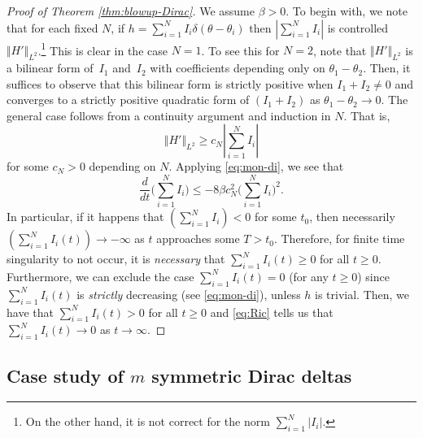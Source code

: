 \documentclass[10pt]{amsart}
\theoremstyle{plain}
\theoremstyle{definition}
\newcommand{\nrm}[1]{\Vert#1\Vert}
\let\bt\beta
\let\dlt\delta
\let\tht\theta
\begin{document}
\begin{proof}[Proof of Theorem \ref{thm:blowup-Dirac}]

We assume $\bt>0$. To begin with, we note that for each fixed $N$, if $h = \sum_{i=1}^{N} I_i\dlt(\tht-\tht_i)$ then $|\sum_{i=1}^{N} I_i|$ is controlled $\nrm{H'}_{L^{2}}$.\footnote{On the other hand, it is not correct for the norm $\sum_{i=1}^{N} |I_i|$.} This is clear in the case $N=1$. To see this for $N=2$, note that $\nrm{H'}_{L^2}$ is a bilinear form of~$I_1$ and~$I_2$ with coefficients depending only on $\tht_1-\tht_2$. Then, it suffices to observe that this bilinear form is strictly positive when $I_1+I_2 \ne 0$ and converges to a strictly positive quadratic form of $(I_1+I_2)$ as $\tht_1-\tht_2 \to 0$. The general case follows from a continuity argument and induction in $N$. That is,
\begin{equation*}
\nrm{H'}_{L^2} \ge c_N|\sum_{i=1}^{N} I_i|
\end{equation*}
for some $c_N>0$ depending on $N$. Applying \eqref{eq:mon-di}, we see that
\begin{equation}\label{eq:Ric}
\frac{d}{dt} \biggl(\sum_{i=1}^{N} I_i\biggr) \le -8\bt c_{N}^{2} \biggl(\sum_{i=1}^{N} I_i\biggr)^{2}.
\end{equation}
In particular, if it happens that $(\sum_{i=1}^{N} I_i) < 0$ for some $t_0$, then necessarily $(\sum_{i=1}^{N} I_i(t)) \to -\infty$ as $t$ approaches some $T>t_0$. Therefore, for finite time singularity to not occur, it is \textit{necessary} that $\sum_{i=1}^{N} I_i(t) \ge 0$ for all $t\ge0$. Furthermore, we can exclude the case $\sum_{i=1}^{N} I_i(t) = 0$ (for any $t\ge0$) since $\sum_{i=1}^{N} I_i(t)$ is \textit{strictly} decreasing (see \eqref{eq:mon-di}), unless $h$ is trivial. Then, we have that $\sum_{i=1}^{N} I_i(t) > 0$ for all $t\ge0$ and \eqref{eq:Ric} tells us that $\sum_{i=1}^{N} I_i(t) \to 0$ as $t\to\infty$.\end{proof}

\subsection{Case study of $m$ symmetric Dirac deltas}\label{subsec:case-study}
\end{document}
